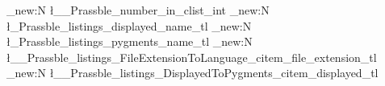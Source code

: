 \ExplSyntaxOn
    \int_new:N \l__Prassble_number_in_clist_int
      \tl_new:N \l_Prassble_listings_displayed_name_tl
      \tl_new:N \l_Prassble_listings_pygments_name_tl
      \tl_new:N \l__Prassble_listings_FileExtensionToLanguage_citem_file_extension_tl
      \tl_new:N \l__Prassble_listings_DisplayedToPygments_citem_displayed_tl
